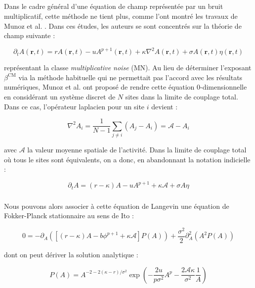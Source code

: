 \subparagraph{}Dans le cadre général d'une équation de champ représentée par un bruit multiplicatif, cette méthode ne tient plus, comme l'ont montré les travaux de Munoz et al. \cite{munoz_multiplicative_2003, munoz_mean_field_2005}. Dans ces études, les auteurs se sont concentrés sur la théorie de champ suivante :

\begin{equation}
	\partial_t A(\mathbf{r}, t) = rA(\mathbf{r}, t) - uA^{p+1}(\mathbf{r}, t) + \kappa\nabla^2 A (\mathbf{r}, t) + \sigma A(\mathbf{r}, t) \eta(\mathbf{r}, t)
	\label{eq:eqMN}
\end{equation}

\noindent représentant la classe \textit{multiplicative noise} (MN). Au lieu de déterminer l'exposant $\beta^\text{CM}$ via la méthode habituelle qui ne permettait pas l'accord avec les résultats numériques, Munoz et al. ont proposé de rendre cette équation 0-dimensionnelle en considérant un système discret de $N$ sites dans la limite de couplage total. Dans ce cas, l'opérateur laplacien pour un site $i$ devient :

\begin{equation}
    \nabla^2 A_i = \frac{1}{N-1}\sum_{j\neq i}\left( A_j - A_i \right) = \mathcal{A} - A_i
\end{equation}

\noindent avec $\mathcal{A}$ la valeur moyenne spatiale de l'activité. Dans la limite de couplage total où tous le sites sont équivalents, on a donc, en abandonnant la notation indicielle :

\begin{equation}
	\partial_t A = (r-\kappa)A - uA^{p+1} + \kappa\mathcal{A} + \sigma A \eta
	\label{eq:eqMN0}
\end{equation}

\subparagraph{}Nous pouvons alors associer à cette équation de Langevin une équation de Fokker-Planck stationnaire au sens de Ito :

\begin{equation}
    0 = -\partial_A\left( \left[(r-\kappa)A - b\phi^{p+1}+\kappa\mathcal{A} \right] P(A)\right) + \frac{\sigma^2}{2}\partial_A^2\left( A^2 P(A)\right)
\end{equation}

\noindent dont on peut dériver la solution analytique :

\begin{equation}
    P(A) = A^{-2-2(\kappa-r)/\sigma^2}\exp\left( -\frac{2u}{p\sigma^2}A^p - \frac{2\mathcal{A} \kappa}{\sigma^2}\frac{1}{A} \right)
\end{equation}


